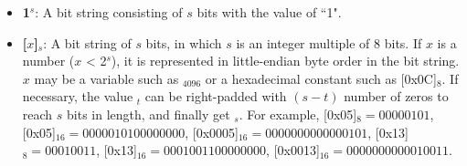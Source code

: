 \documentclass[main\_\_EN.tex]{subfiles}
\begin{document}
\begin{itemize}

    \item {\bfseries 1\begin{math}^s\end{math}}:
    A bit string consisting of \begin{math}s\end{math} bits with the value of ``1".

    \item {\bfseries [\begin{math}x\end{math}]\begin{math}_{s}\end{math}}:
       A bit string of \begin{math}s\end{math} bits, in which \begin{math}s\end{math} is an integer multiple of 8 bits. If \begin{math}x\end{math} is a number (\begin{math}x\end{math} < 2\begin{math}^s\end{math}), it is represented in little-endian byte order in the bit string. \begin{math}x\end{math} may be a variable such as \begin{math}[Y]_{4096}\end{math} or a hexadecimal constant such as [0x0C]\begin{math}_{8}\end{math}. If necessary, the value \begin{math}[x]_{t}\end{math} can be right-padded with \begin{math} (s-t) \end{math} number of zeros to reach \begin{math}s\end{math} bits in length, and finally get \begin{math}[x]_{s}\end{math}. For example, [0x05]\begin{math}_{8} = 00000101\end{math},
       [0x05]\begin{math}_{16} = 00000101 00000000\end{math},
       [0x0005]\begin{math}_{16} = 00000000 00000101\end{math},
       [0x13]\begin{math}_{8} = 00010011\end{math},
       [0x13]\begin{math}_{16} = 00010011 00000000\end{math},
       [0x0013]\begin{math}_{16} = 00000000 00010011\end{math}.


\end{itemize}
\end{document}
